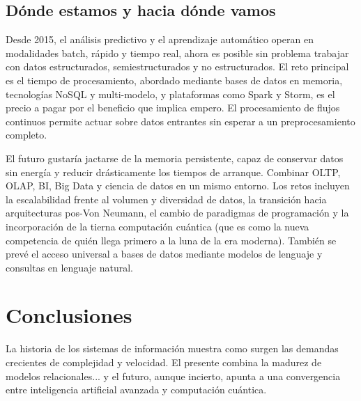 \documentclass[12pt]{article}
\numberwithin{equation}{section}
\numberwithin{figure}{section}
\numberwithin{table}{section}
\begin{document}
\subsection*{Dónde estamos y hacia dónde vamos}

Desde 2015, el análisis predictivo y el aprendizaje automático operan en modalidades batch, rápido y tiempo real, ahora es posible sin problema trabajar con datos estructurados, semiestructurados y no estructurados. El reto principal es el tiempo de procesamiento, abordado mediante bases de datos en memoria, tecnologías NoSQL y multi-modelo, y plataformas como Spark y Storm, es el precio a pagar por el beneficio que implica empero. El procesamiento de flujos continuos permite actuar sobre datos entrantes sin esperar a un preprocesamiento completo.

El futuro gustaría jactarse de la memoria persistente, capaz de conservar datos sin energía y reducir drásticamente los tiempos de arranque. Combinar OLTP, OLAP, BI, Big Data y ciencia de datos en un mismo entorno. Los retos incluyen la escalabilidad frente al volumen y diversidad de datos, la transición hacia arquitecturas pos-Von Neumann, el cambio de paradigmas de programación y la incorporación de la tierna computación cuántica (que es como la nueva competencia de quién llega primero a la luna de la era moderna). También se prevé el acceso universal a bases de datos mediante modelos de lenguaje y consultas en lenguaje natural.


\section{Conclusiones}
La historia de los sistemas de información muestra como surgen las demandas crecientes de complejidad y velocidad. El presente combina la madurez de modelos relacionales... y el futuro, aunque incierto, apunta a una convergencia entre inteligencia artificial avanzada y computación cuántica.
\end{document}
